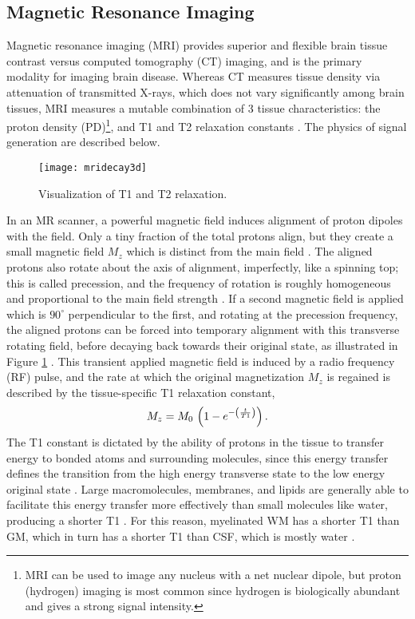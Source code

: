 \subsection{Magnetic Resonance Imaging}\label{ss:mri}
Magnetic resonance imaging (MRI) provides superior and flexible brain tissue contrast versus computed tomography (CT) imaging, and is the primary modality for imaging brain disease. Whereas CT measures tissue density via attenuation of transmitted X-rays, which does not vary significantly among brain tissues, MRI measures a mutable combination of 3 tissue characteristics: the proton density (PD)\footnote{MRI can be used to image any nucleus with a net nuclear dipole, but proton (hydrogen) imaging is most common since hydrogen is biologically abundant and gives a strong signal intensity.}, and T1 and T2 relaxation constants \cite{Pooley2005}. The physics of signal generation are described below.
\par
\begin{figure}[b]
  \centering\texttt{[image: mridecay3d]}
  \caption{Visualization of T1 and T2 relaxation.}
  \label{fig:mridecay3d}
\end{figure}
In an MR scanner, a powerful magnetic field induces alignment of proton dipoles with the field. Only a tiny fraction of the total protons align, but they create a small magnetic field $M_z$ which is distinct from the main field \cite{Bloch1946}. The aligned protons also rotate about the axis of alignment, imperfectly, like a spinning top; this is called precession, and the frequency of rotation is roughly homogeneous and proportional to the main field strength \cite{Bloch1946}. If a second magnetic field is applied which is $90^{\circ}$ perpendicular to the first, and rotating at the precession frequency, the aligned protons can be forced into temporary alignment with this transverse rotating field, before decaying back towards their original state, as illustrated in Figure \ref{fig:mridecay3d} \cite{Bloch1946}. This transient applied magnetic field is induced by a radio frequency (RF) pulse, and the rate at which the original magnetization $M_z$ is regained is described by the tissue-specific T1 relaxation constant,
\begin{equation}
M_z = M_0\thinspace\left(1-e^{-\left(\frac{t}{T1}\right)}\right)\label{eq:T1}.
\end{equation}
The T1 constant is dictated by the ability of protons in the tissue to transfer energy to bonded atoms and surrounding molecules, since this energy transfer defines the transition from the high energy transverse state to the low energy original state \cite{Bloch1946,Bryant2005}. Large macromolecules, membranes, and lipids are generally able to facilitate this energy transfer more effectively than small molecules like water, producing a shorter T1 \cite{Koenig1990}. For this reason, myelinated WM has a shorter T1 than GM, which in turn has a shorter T1 than CSF, which is mostly water \cite{Roberts2007}.
